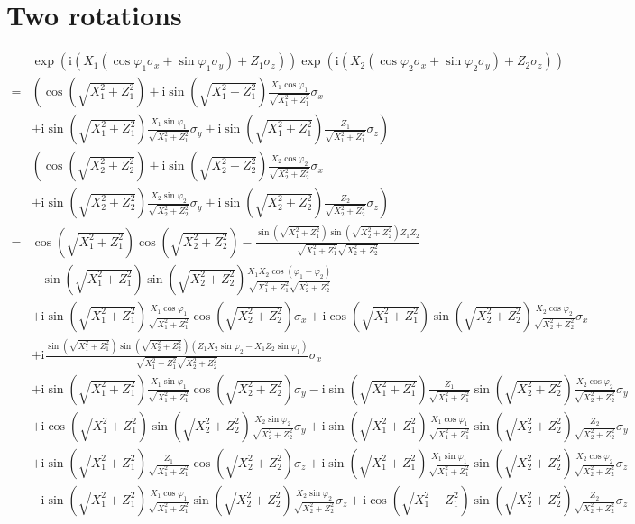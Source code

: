 \documentclass[10pt,fleqn]{article}
\newcommand{\ui}{\mathrm{i}}
\newcommand{\eqar}[1]
{
  \begin{align*}
    #1
  \end{align*}
}
\newcommand{\paren}[1]{{\left({#1}\right)}}
\newcommand{\lparen}[1]{{\left({#1}\right.}}
\newcommand{\rparen}[1]{{\left.{#1}\right)}}
\begin{document}
\section{Two rotations}
\eqar{
  &\exp\paren{\ui\paren{X_1\paren{\cos\varphi_1\sigma_x+\sin\varphi_1\sigma_y}+Z_1\sigma_z}}\exp\paren{\ui\paren{X_2\paren{\cos\varphi_2\sigma_x+\sin\varphi_2\sigma_y}+Z_2\sigma_z}}\\
  =&\lparen{\cos\paren{\sqrt{X_1^2+Z_1^2}}+\ui\sin\paren{\sqrt{X_1^2+Z_1^2}}\frac{X_1\cos\varphi_1}{\sqrt{X_1^2+Z_1^2}}\sigma_x}\\
  &+\rparen{\ui\sin\paren{\sqrt{X_1^2+Z_1^2}}\frac{X_1\sin\varphi_1}{\sqrt{X_1^2+Z_1^2}}\sigma_y+\ui\sin\paren{\sqrt{X_1^2+Z_1^2}}\frac{Z_1}{\sqrt{X_1^2+Z_1^2}}\sigma_z}\\
  &\lparen{\cos\paren{\sqrt{X_2^2+Z_2^2}}+\ui\sin\paren{\sqrt{X_2^2+Z_2^2}}\frac{X_2\cos\varphi_2}{\sqrt{X_2^2+Z_2^2}}\sigma_x}\\
  &+\rparen{\ui\sin\paren{\sqrt{X_2^2+Z_2^2}}\frac{X_2\sin\varphi_2}{\sqrt{X_2^2+Z_2^2}}\sigma_y+\ui\sin\paren{\sqrt{X_2^2+Z_2^2}}\frac{Z_2}{\sqrt{X_2^2+Z_2^2}}\sigma_z}\\
  =&\cos\paren{\sqrt{X_1^2+Z_1^2}}\cos\paren{\sqrt{X_2^2+Z_2^2}}
  -\frac{\sin\paren{\sqrt{X_1^2+Z_1^2}}\sin\paren{\sqrt{X_2^2+Z_2^2}}Z_1Z_2}{\sqrt{X_1^2+Z_1^2}\sqrt{X_2^2+Z_2^2}}\\
  &
  -\sin\paren{\sqrt{X_1^2+Z_1^2}}\sin\paren{\sqrt{X_2^2+Z_2^2}}\frac{X_1X_2\cos\paren{\varphi_1-\varphi_2}}{\sqrt{X_1^2+Z_1^2}\sqrt{X_2^2+Z_2^2}}
  \\
  &+\ui\sin\paren{\sqrt{X_1^2+Z_1^2}}\frac{X_1\cos\varphi_1}{\sqrt{X_1^2+Z_1^2}}\cos\paren{\sqrt{X_2^2+Z_2^2}}\sigma_x+\ui\cos\paren{\sqrt{X_1^2+Z_1^2}}\sin\paren{\sqrt{X_2^2+Z_2^2}}\frac{X_2\cos\varphi_2}{\sqrt{X_2^2+Z_2^2}}\sigma_x\\
  &+\ui\frac{\sin\paren{\sqrt{X_1^2+Z_1^2}}\sin\paren{\sqrt{X_2^2+Z_2^2}}\paren{Z_1X_2\sin\varphi_2-X_1Z_2\sin\varphi_1}}{\sqrt{X_1^2+Z_1^2}\sqrt{X_2^2+Z_2^2}}\sigma_x\\
  &+\ui\sin\paren{\sqrt{X_1^2+Z_1^2}}\frac{X_1\sin\varphi_1}{\sqrt{X_1^2+Z_1^2}}\cos\paren{\sqrt{X_2^2+Z_2^2}}\sigma_y-\ui\sin\paren{\sqrt{X_1^2+Z_1^2}}\frac{Z_1}{\sqrt{X_1^2+Z_1^2}}\sin\paren{\sqrt{X_2^2+Z_2^2}}\frac{X_2\cos\varphi_2}{\sqrt{X_2^2+Z_2^2}}\sigma_y\\
  &+\ui\cos\paren{\sqrt{X_1^2+Z_1^2}}\sin\paren{\sqrt{X_2^2+Z_2^2}}\frac{X_2\sin\varphi_2}{\sqrt{X_2^2+Z_2^2}}\sigma_y+\ui\sin\paren{\sqrt{X_1^2+Z_1^2}}\frac{X_1\cos\varphi_1}{\sqrt{X_1^2+Z_1^2}}\sin\paren{\sqrt{X_2^2+Z_2^2}}\frac{Z_2}{\sqrt{X_2^2+Z_2^2}}\sigma_y\\
  &+\ui\sin\paren{\sqrt{X_1^2+Z_1^2}}\frac{Z_1}{\sqrt{X_1^2+Z_1^2}}\cos\paren{\sqrt{X_2^2+Z_2^2}}\sigma_z+\ui\sin\paren{\sqrt{X_1^2+Z_1^2}}\frac{X_1\sin\varphi_1}{\sqrt{X_1^2+Z_1^2}}\sin\paren{\sqrt{X_2^2+Z_2^2}}\frac{X_2\cos\varphi_2}{\sqrt{X_2^2+Z_2^2}}\sigma_z\\
  &-\ui\sin\paren{\sqrt{X_1^2+Z_1^2}}\frac{X_1\cos\varphi_1}{\sqrt{X_1^2+Z_1^2}}\sin\paren{\sqrt{X_2^2+Z_2^2}}\frac{X_2\sin\varphi_2}{\sqrt{X_2^2+Z_2^2}}\sigma_z+\ui\cos\paren{\sqrt{X_1^2+Z_1^2}}\sin\paren{\sqrt{X_2^2+Z_2^2}}\frac{Z_2}{\sqrt{X_2^2+Z_2^2}}\sigma_z
  \\
}
\end{document}
